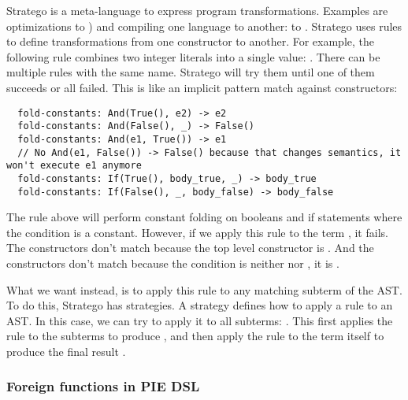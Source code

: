 Stratego is a meta-language to express program transformations.
Examples are optimizations  to ) and compiling one language to another:  to .
Stratego uses rules to define transformations from one constructor to another.
For example, the following rule combines two integer literals into a single value: .
There can be multiple rules with the same name.
Stratego will try them until one of them succeeds or all failed.
This is like an implicit pattern match against constructors:
\begin{lstlisting}
  fold-constants: And(True(), e2) -> e2
  fold-constants: And(False(), _) -> False()
  fold-constants: And(e1, True()) -> e1
  // No And(e1, False()) -> False() because that changes semantics, it won't execute e1 anymore
  fold-constants: If(True(), body_true, _) -> body_true
  fold-constants: If(False(), _, body_false) -> body_false
\end{lstlisting}

The  rule above will perform constant folding on booleans and if statements where the condition is a constant.
However, if we apply this rule to the term , it fails.
The  constructors don't match because the top level constructor is .
And the  constructors don't match because the condition is neither  nor , it is .

What we want instead, is to apply this rule to any matching subterm of the \ac{AST}.
To do this, Stratego has strategies.
A strategy defines how to apply a rule to an \ac{AST}.
In this case, we can try to apply it to all subterms: .
This first applies the rule to the subterms to produce , and then apply the rule to the term itself to produce the final result .

\subsubsection{Foreign functions in \ac{PIE} \ac{DSL}}
\label{subsubsec:problem_analysis__background__foreign_functions}

